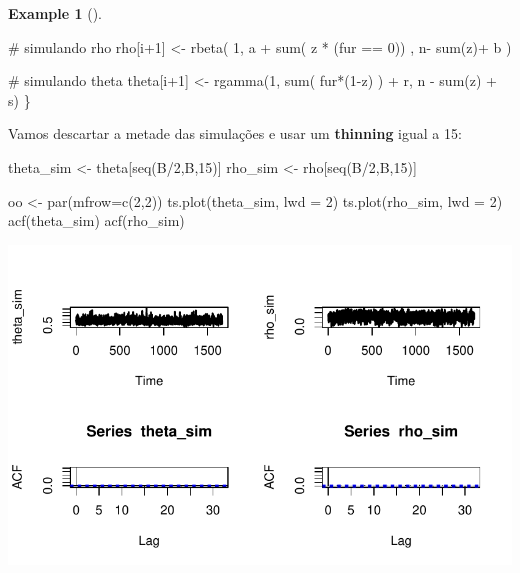 \documentclass[
  letterpaper,
  DIV=11,
  numbers=noendperiod]{scrreprt}
\newenvironment{Shaded}{\begin{snugshade}}{\end{snugshade}}
\newcommand{\AttributeTok}[1]{\textcolor[rgb]{0.40,0.45,0.13}{#1}}
\newcommand{\CommentTok}[1]{\textcolor[rgb]{0.37,0.37,0.37}{#1}}
\newcommand{\DecValTok}[1]{\textcolor[rgb]{0.68,0.00,0.00}{#1}}
\newcommand{\FunctionTok}[1]{\textcolor[rgb]{0.28,0.35,0.67}{#1}}
\newcommand{\NormalTok}[1]{\textcolor[rgb]{0.00,0.23,0.31}{#1}}
\newcommand{\OtherTok}[1]{\textcolor[rgb]{0.00,0.23,0.31}{#1}}
\newcommand{\SpecialCharTok}[1]{\textcolor[rgb]{0.37,0.37,0.37}{#1}}
\theoremstyle{definition}
\theoremstyle{plain}
\theoremstyle{definition}
\newtheorem{example}{Example}[chapter]
\theoremstyle{remark}
\begin{document}
\begin{example}[]
\begin{Shaded}
\begin{Highlighting}[]
  \CommentTok{\# simulando rho}
\NormalTok{  rho[i}\SpecialCharTok{+}\DecValTok{1}\NormalTok{] }\OtherTok{\textless{}{-}} \FunctionTok{rbeta}\NormalTok{( }\DecValTok{1}\NormalTok{, a }\SpecialCharTok{+} \FunctionTok{sum}\NormalTok{( z }\SpecialCharTok{*}\NormalTok{ (fur }\SpecialCharTok{==} \DecValTok{0}\NormalTok{)) , n}\SpecialCharTok{{-}} \FunctionTok{sum}\NormalTok{(z)}\SpecialCharTok{+}\NormalTok{ b )}
  
  \CommentTok{\# simulando theta}
\NormalTok{  theta[i}\SpecialCharTok{+}\DecValTok{1}\NormalTok{] }\OtherTok{\textless{}{-}} \FunctionTok{rgamma}\NormalTok{(}\DecValTok{1}\NormalTok{, }\FunctionTok{sum}\NormalTok{( fur}\SpecialCharTok{*}\NormalTok{(}\DecValTok{1}\SpecialCharTok{{-}}\NormalTok{z) ) }\SpecialCharTok{+}\NormalTok{ r,  n }\SpecialCharTok{{-}} \FunctionTok{sum}\NormalTok{(z) }\SpecialCharTok{+}\NormalTok{ s)}
\NormalTok{\}}
\end{Highlighting}
\end{Shaded}

Vamos descartar a metade das simulações e usar um \textbf{thinning}
igual a 15:

\begin{Shaded}
\begin{Highlighting}[]
\NormalTok{theta\_sim }\OtherTok{\textless{}{-}}\NormalTok{ theta[}\FunctionTok{seq}\NormalTok{(B}\SpecialCharTok{/}\DecValTok{2}\NormalTok{,B,}\DecValTok{15}\NormalTok{)]}
\NormalTok{rho\_sim }\OtherTok{\textless{}{-}}\NormalTok{ rho[}\FunctionTok{seq}\NormalTok{(B}\SpecialCharTok{/}\DecValTok{2}\NormalTok{,B,}\DecValTok{15}\NormalTok{)]}

\NormalTok{oo }\OtherTok{\textless{}{-}} \FunctionTok{par}\NormalTok{(}\AttributeTok{mfrow=}\FunctionTok{c}\NormalTok{(}\DecValTok{2}\NormalTok{,}\DecValTok{2}\NormalTok{))}
\FunctionTok{ts.plot}\NormalTok{(theta\_sim, }\AttributeTok{lwd =} \DecValTok{2}\NormalTok{)}
\FunctionTok{ts.plot}\NormalTok{(rho\_sim, }\AttributeTok{lwd =} \DecValTok{2}\NormalTok{)}
\FunctionTok{acf}\NormalTok{(theta\_sim)}
\FunctionTok{acf}\NormalTok{(rho\_sim)}
\end{Highlighting}
\end{Shaded}

\includegraphics{misturas_files/figure-pdf/unnamed-chunk-4-1.pdf}


\end{example}
\end{document}
